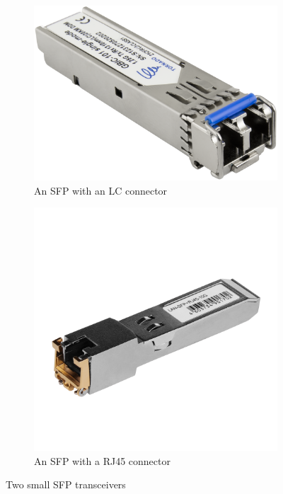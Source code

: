 \begin{figure}
   \begin{subfigure}[b]{0.45\textwidth}
   \centering
   \includegraphics[width=\textwidth]{images/physical/sfp.png}
   \caption{An \acs{SFP} with an \acs{LC} connector}
   \label{fig:sfp-lc}
   \end{subfigure}
   \hfill
   \begin{subfigure}[b]{0.45\textwidth}
   \centering
   \includegraphics[width=\textwidth]{images/physical/sfp-rj45.png}
   \caption{An \acs{SFP} with a \acs{RJ45} connector}
   \label{fig:sfp-rj45}
   \end{subfigure}
   \caption{Two small \acf{SFP} transceivers}
   \label{fig:sfp}
\end{figure}

